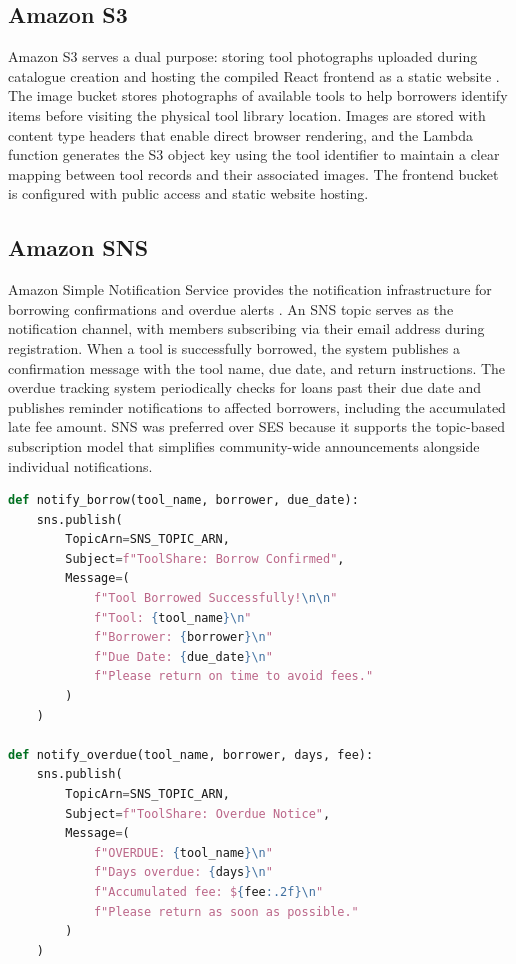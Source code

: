 \documentclass[conference]{IEEEtran}
\begin{document}
\subsection{Amazon S3}

Amazon S3 serves a dual purpose: storing tool photographs uploaded during catalogue creation and hosting the compiled React frontend as a static website \cite{awss3}. The image bucket stores photographs of available tools to help borrowers identify items before visiting the physical tool library location. Images are stored with content type headers that enable direct browser rendering, and the Lambda function generates the S3 object key using the tool identifier to maintain a clear mapping between tool records and their associated images. The frontend bucket is configured with public access and static website hosting.

\subsection{Amazon SNS}

Amazon Simple Notification Service provides the notification infrastructure for borrowing confirmations and overdue alerts \cite{awssns}. An SNS topic serves as the notification channel, with members subscribing via their email address during registration. When a tool is successfully borrowed, the system publishes a confirmation message with the tool name, due date, and return instructions. The overdue tracking system periodically checks for loans past their due date and publishes reminder notifications to affected borrowers, including the accumulated late fee amount. SNS was preferred over SES because it supports the topic-based subscription model that simplifies community-wide announcements alongside individual notifications.

\begin{lstlisting}[language=Python, caption={SNS notification for borrow confirmation and overdue alert}]
def notify_borrow(tool_name, borrower, due_date):
    sns.publish(
        TopicArn=SNS_TOPIC_ARN,
        Subject=f"ToolShare: Borrow Confirmed",
        Message=(
            f"Tool Borrowed Successfully!\n\n"
            f"Tool: {tool_name}\n"
            f"Borrower: {borrower}\n"
            f"Due Date: {due_date}\n"
            f"Please return on time to avoid fees."
        )
    )

def notify_overdue(tool_name, borrower, days, fee):
    sns.publish(
        TopicArn=SNS_TOPIC_ARN,
        Subject=f"ToolShare: Overdue Notice",
        Message=(
            f"OVERDUE: {tool_name}\n"
            f"Days overdue: {days}\n"
            f"Accumulated fee: ${fee:.2f}\n"
            f"Please return as soon as possible."
        )
    )
\end{lstlisting}
\end{document}
